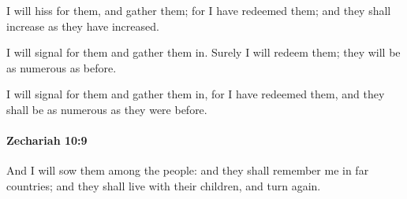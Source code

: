 			\begin{versebox}
					\item[BHS] 
					\item[LXX] 
					\item[ASV] I will hiss for them, and gather them; for I have redeemed them; and they shall increase as they have increased.
					\item[NIV] I will signal for them and gather them in. Surely I will redeem them; they will be as numerous as before.
					\item[NRSV] I will signal for them and gather them in, for I have redeemed them, and they shall be as numerous as they were before.
			\end{versebox}

		\paragraph{Zechariah 10:9} %
			\label{ZECHARIAH-10-9}

			And I will sow them among the people: and they shall remember me in far countries; and they shall live with their children, and turn again.

